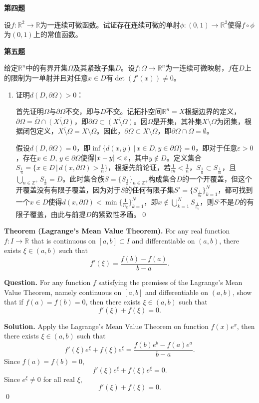 \documentclass[10pt]{article}
\DeclarePairedDelimiter\abs{\lvert}{\rvert}
\begin{document}
\begin{CJK*}{UTF8}{gbsn}
\textbf{第四题}

设$f:\mathbb{R}^2\to\mathbb{R}$为一连续可微函数。试证存在连续可微的单射$\phi:(0,1)\to\mathbb{R}^2$使得$f\circ\phi$为$(0,1)$上的常值函数。

\textbf{第五题}

给定$\mathbb{R}^n$中的有界开集$\Omega$及其紧致子集$D$。设$f:\Omega\to\mathbb{R}^n$为一连续可微映射，$f$在$D$上的限制为一单射并且对任意$x\in D$有$\det(f'(x))\neq0$。
\begin{enumerate}
\item 证明$d(D,\partial\Omega)>0$：

首先证明$\Omega$与$\partial\Omega$不交，即与$D$不交。记拓扑空间$\mathbb{R}^n=X$根据边界的定义，$\partial\Omega=\overline{\Omega}\cap\overline{(X\setminus\Omega)}$，即$\partial\Omega\subset\overline{(X\setminus\Omega)}$。因$\Omega$是开集，其补集$X\setminus\Omega$为闭集，根据闭包定义，$\overline{X\setminus\Omega}=X\setminus\Omega$。因此，$\partial\Omega\subset X\setminus\Omega$，即$\partial\Omega\cap\Omega=\emptyset$。

假设$d(D,\partial\Omega)=0$，即$\inf\{d(x,y)\,\big|\,x\in D,y\in\partial\Omega\}=0$，即对于任意$\varepsilon>0$，存在$x\in D,\,y\in\partial\Omega$使得$\abs{x-y}<\varepsilon$，其中$y\notin D$。定义集合$S_{\frac{1}{n}}=\{x\in D\,\big|\,d(x,\partial\Omega)>\frac{1}{n}\}$，根据先前论证，若$\frac{1}{m}<\frac{1}{n}$，$S_{\frac{1}{n}}\subset S_{\frac{1}{m}}$，且$\bigcup_{n\in\mathbb{Z}^+}S_{\frac{1}{n}}=D$。此时集合族$S=\{S_{\frac{1}{n}}\}_{n\in\mathbb{Z}^+}$构成集合$D$的一个开覆盖，但这个开覆盖没有有限子覆盖，因为对于$S$的任何有限子集$S'=\{S_{\frac{1}{n_k}}\}_{k=1}^N$，都可找到一个$x\in D$使得$d(x,\partial\Omega)<\min\{\frac{1}{n_k}\}_{k=1}^N$，即$x\notin\bigcup_{k=1}^N S_{\frac{1}{n_k}}$，则$S‘$不是$D$的有限子覆盖，由此与前提$D$的紧致性矛盾。\qed
\end{enumerate}

\newpage
\textbf{Theorem (Lagrange's Mean Value Theorem).} For any real function $f:I\to\mathbb{R}$ that is continuous on $[a,b]\subset I$ and differentiable on $(a,b)$, there exists $\xi\in(a,b)$ such that
$$
f'(\xi)=\frac{f(b)-f(a)}{b-a}.
$$

\textbf{Question.} For any function $f$ satisfying the premises of the Lagrange's Mean Value Theorem, namely continuous on $[a,b]$ and differentiable on $(a,b)$, show that if $f(a)=f(b)=0$, then there exists $\xi\in(a,b)$ such that
$$
f'(\xi)+f(\xi)=0.
$$

\vspace{6em}
\textbf{Solution.} Apply the Lagrange's Mean Value Theorem on function $f(x)e^x$, then there exists $\xi\in(a,b)$ such that
$$
f'(\xi)e^\xi+f(\xi)e^\xi=\frac{f(b)e^b-f(a)e^a}{b-a}.
$$
Since $f(a)=f(b)=0$,
$$
f'(\xi)e^\xi+f(\xi)e^\xi=0.
$$
Since $e^\xi\neq0$ for all real $\xi$,
$$
f'(\xi)+f(\xi)=0.
$$\qed


\end{CJK*}
\end{document}
